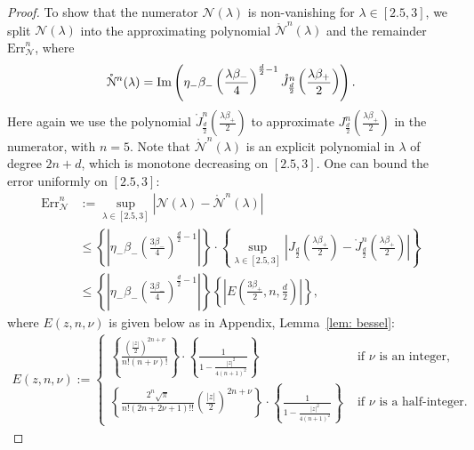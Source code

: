 \documentclass[11pt,a4paper,english,reqno]{amsart}
\theoremstyle{plain}
\newcommand{\1}{\mathbbm{1}}
\begin{document}
\begin{proof}
To show that the numerator $\mathcal{N}(\lambda)$ is non-vanishing for $\lambda \in [2.5, 3]$, we split $\mathcal{N}(\lambda)$ into the approximating polynomial $\mathring{\mathcal{N}}^{n}(\lambda)$ and the remainder $\text{Err}^{n}_{\mathcal{N}}$,
where 
\begin{eqnarray*}
\mathring{\mathcal{N}}^{n}(\lambda) = {\rm Im}\left( \eta_{-}\beta_{-}\left(\frac{\lambda \beta_{-}}{4}\right)^{\frac{d}{2}-1} \mathring{J}^n_{\frac{d}{2}}\left(\frac{\lambda \beta_{+}}{2}\right)\right).
\end{eqnarray*}
Here again we use the polynomial $\mathring{J}^{n}_{\frac{d}{2}}\left(\frac{\lambda \beta_{+}}{2}\right)$ to approximate ${J}^{n}_{\frac{d}{2}}\left(\frac{\lambda \beta_{+}}{2}\right)$ in the numerator, with $n = 5$. Note that $\mathring{\mathcal{N}}^{n}(\lambda)$ is an explicit polynomial in $\lambda$ of degree $2n+d$, which is monotone decreasing on $[2.5, 3]$. One can bound the error   uniformly on $[2.5, 3]$:
\begin{align*}
\text{Err}_{\mathcal{N}}^{n}&:=\sup_{\lambda \in [2.5, 3]} \left|\mathcal{N}(\lambda) - \mathring{\mathcal{N}}^{n}(\lambda)\right| \\
&\leq \left\{\left|\eta_{-} \beta_{-} \left(\frac{3 \beta_{-}}{4}\right)^{\frac{d}{2}-1}\right|\right\} \cdot \left\{ \sup_{\lambda \in [2.5, 3]} \left|J_{\frac{d}{2}}\left(\frac{\lambda \beta_{+}}{2}\right) - \mathring{J}^{n}_{\frac{d}{2}}\left(\frac{\lambda \beta_{+}}{2}\right)\right|\right\}\\
&\leq \left\{\left| \eta_{-} \beta_{-} \left(\frac{3 \beta_{-}}{4}\right)^{\frac{d}{2}-1}\right| \right\}\left\{\left|E\left(\frac{3\beta_{+}}{2}, n, \frac{d}{2}\right)\right|\right\},
\end{align*}
where $E(z,n,\nu)$ is given below as in Appendix, Lemma~\ref{lem: bessel}:
\begin{eqnarray*}
E(z, n, \nu) := \begin{cases}
\left\{ \frac{\left(\frac{|z|}{2}\right)^{2n+\nu}}{n!(n+\nu)!}\right\} \cdot \left\{ \frac{1}{1-\frac{|z|^2}{4(n+1)^2}} \right\} &\text{ if $\nu$ is an integer},\\
\left\{\frac{2^n \sqrt{\pi}}{{n! (2n+2\nu+1)!!}} \left(\frac{|z|}{2}\right)^{2n+\nu}\right\}\cdot \left\{\frac{1}{1- \frac{|z|^2}{4(n+1)^2}}\right\}& \text{ if $\nu$ is a half-integer}.
\end{cases}
\end{eqnarray*}



\end{proof}
\end{document}
